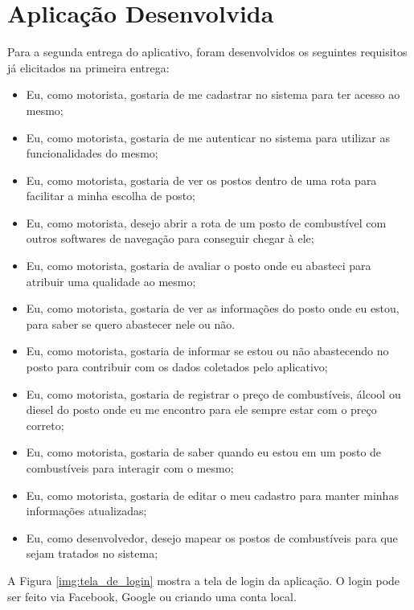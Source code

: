 \section{Aplicação Desenvolvida}
Para a segunda entrega do aplicativo, foram desenvolvidos os seguintes requisitos já elicitados na primeira entrega:
\begin{itemize}
    \item Eu, como motorista, gostaria de me cadastrar no sistema para ter acesso ao mesmo;
    \item Eu, como motorista, gostaria de me autenticar no sistema para utilizar as funcionalidades do mesmo;
    \item Eu, como motorista, gostaria de ver os postos dentro de uma rota para facilitar a minha escolha de posto;
    \item Eu, como motorista, desejo abrir a rota de um posto de combustível com outros softwares de navegação para conseguir chegar à ele;
    \item Eu, como motorista, gostaria de avaliar o posto onde eu abasteci para atribuir uma qualidade ao mesmo;
    \item Eu, como motorista, gostaria de ver as informações do posto onde eu estou, para saber se quero abastecer nele ou não.
    \item Eu, como motorista, gostaria de informar se estou ou não abastecendo no posto para contribuir com os dados coletados pelo aplicativo;
    \item Eu, como motorista, gostaria de registrar o preço de combustíveis, álcool ou diesel do posto onde eu me encontro para ele sempre estar com o preço correto;
    \item Eu, como motorista, gostaria de saber quando eu estou em um posto de combustíveis para interagir com o mesmo;
    \item Eu, como motorista, gostaria de editar o meu cadastro para manter minhas informações atualizadas;
    \item Eu, como desenvolvedor, desejo mapear os postos de combustíveis para que sejam tratados no sistema;
\end{itemize}

A Figura \ref{img:tela_de_login} mostra a tela de login da aplicação. O login pode ser feito via Facebook, Google ou criando uma conta local.

